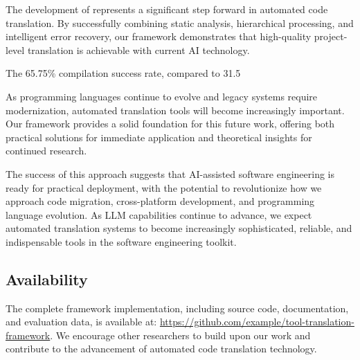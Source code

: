 The development of \tool{} represents a significant step forward in automated code translation. By successfully combining static analysis, hierarchical processing, and intelligent error recovery, our framework demonstrates that high-quality project-level translation is achievable with current AI technology.

The 65.75\% compilation success rate, compared to 31.5%

As programming languages continue to evolve and legacy systems require modernization, automated translation tools will become increasingly important. Our framework provides a solid foundation for this future work, offering both practical solutions for immediate application and theoretical insights for continued research.

The success of this approach suggests that AI-assisted software engineering is ready for practical deployment, with the potential to revolutionize how we approach code migration, cross-platform development, and programming language evolution. As LLM capabilities continue to advance, we expect automated translation systems to become increasingly sophisticated, reliable, and indispensable tools in the software engineering toolkit.

\subsection{Availability}

The complete framework implementation, including source code, documentation, and evaluation data, is available at: \url{https://github.com/example/tool-translation-framework}. We encourage other researchers to build upon our work and contribute to the advancement of automated code translation technology.